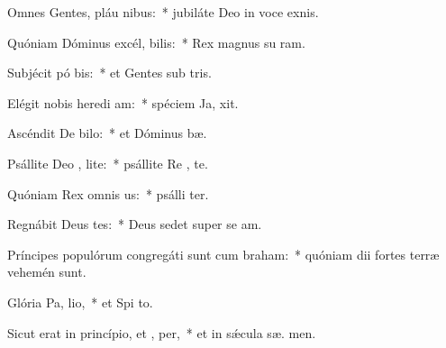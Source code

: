 \item Omnes Gentes, pláu nibus:~* jubiláte Deo in voce exnis.
\item Quóniam Dóminus excél, bilis:~* Rex magnus su  ram.
\item Subjécit pó bis:~* et Gentes sub  tris.
\item Elégit nobis heredi am:~* spéciem Ja,  xit.
\item Ascéndit De  bilo:~* et Dóminus   bæ.
\item Psállite Deo , lite:~* psállite Re , te.
\item Quóniam Rex omnis  us:~* psálli ter.
\item Regnábit Deus  tes:~* Deus sedet super se  am.
\item Príncipes populórum congregáti sunt cum  braham:~* quóniam dii fortes terræ vehemén  sunt.
\item Glória Pa,  lio,~* et Spi to.
\item Sicut erat in princípio, et ,  per,~* et in sǽcula sæ. men.
